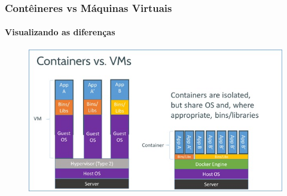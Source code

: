 \documentclass[12pt]{beamer}
\begin{document}
\begin{frame}
  \frametitle{Contêineres vs Máquinas Virtuais}
  \framesubtitle{Visualizando as diferenças}
	\begin{block}{}
		\begin{figure}[!h]
			\centering
			\includegraphics[width=0.6\paperwidth]{vmvscontainer}
		\end{figure}
	\end{block}
\end{frame}
\end{document}
